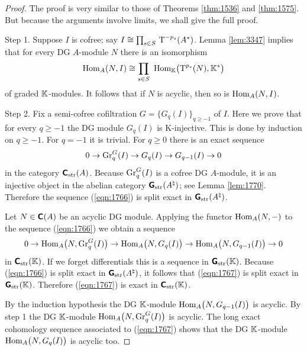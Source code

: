 \begin{proof}
The proof is very similar to those of Theorems \ref{thm:1536} and 
\ref{thm:1575}. But because the arguments involve limits, we shall give the 
full proof. 

\medskip \noindent
Step 1. Suppose $I$ is cofree; say 
$I \cong \prod_{s \in S} \, \operatorname{T}^{-p_s}(A^*)$. 
Lemma \ref{lem:3347} implies that for every DG $A$-module $N$ there is an 
isomorphism 
\[ \operatorname{Hom}_A(N, I) \cong 
\prod_{s \in S} \ \operatorname{Hom}_{\mathbb{K}} \bigl( \operatorname{T}^{p_s}(N), \mathbb{K}^* \bigr)  \]
of graded $\mathbb{K}$-modules.  It follows that if $N$ is acyclic, then so is 
$\operatorname{Hom}_A(N, I)$. 

\medskip \noindent
Step 2. Fix a semi-cofree cofiltration
$G = \{ G_q(I) \}_{q \geq -1}$ of $I$.
Here we prove that for every $q \geq -1$ the DG module  
$G_q(I)$ is K-injective. This is done by induction on $q \geq -1$. 
For $q= -1$ it is trivial. For $q \geq 0$ there is an exact sequence 
\begin{equation} \label{eqn:1766}
0 \to \operatorname{Gr}^G_q(I) \to G_q(I) \to G_{q - 1}(I) \to 0 
\end{equation}
in the category $\boldsymbol{\mathsf{C}}_{\mathrm{str}}(A)$. 
Because $\operatorname{Gr}^G_q(I)$ is a cofree DG $A$-module, it is an injective object 
in the abelian category $\operatorname{\boldsymbol{\mathsf{G}}}_{\mathrm{str}}(A^{\natural})$; see Lemma 
\ref{lem:1770}. Therefore the sequence (\ref{eqn:1766}) is split exact in 
$\operatorname{\boldsymbol{\mathsf{G}}}_{\mathrm{str}}(A^{\natural})$.

Let $N \in \boldsymbol{\mathsf{C}}(A)$ be an acyclic DG module. Applying the 
functor $\operatorname{Hom}_{A}(N, -)$ 
to the sequence (\ref{eqn:1766}) we obtain a sequence 
\begin{equation} \label{eqn:1767}
0 \to \operatorname{Hom}_{A} \bigl( N, \operatorname{Gr}^G_q(I) \bigr) \to 
\operatorname{Hom}_{A} \bigl( N, G_q(I) \bigr) \to
\operatorname{Hom}_{A} \bigl( N, G_{q - 1}(I) \bigr) \to  0 
\end{equation}
in $\boldsymbol{\mathsf{C}}_{\mathrm{str}}(\mathbb{K})$. If we forget differentials this is a sequence in 
$\operatorname{\boldsymbol{\mathsf{G}}}_{\mathrm{str}}(\mathbb{K})$. Because (\ref{eqn:1766}) is split exact in 
$\operatorname{\boldsymbol{\mathsf{G}}}_{\mathrm{str}}(A^{\natural})$, it follows that  (\ref{eqn:1767}) is 
split 
exact in $\operatorname{\boldsymbol{\mathsf{G}}}_{\mathrm{str}}(\mathbb{K})$. Therefore (\ref{eqn:1767}) is exact in 
$\boldsymbol{\mathsf{C}}_{\mathrm{str}}(\mathbb{K})$.

By the induction hypothesis the DG $\mathbb{K}$-module  
$\operatorname{Hom}_{A} \bigl( N, G_{q - 1}(I) \bigr)$
is \lb acyclic. By step 1 the DG $\mathbb{K}$-module
$\operatorname{Hom}_{A} \bigl( N, \operatorname{Gr}^G_{q}(I) \bigr)$
is acyclic. The long exact cohomology sequence associated to 
(\ref{eqn:1767}) shows that the DG $\mathbb{K}$-module 
$\operatorname{Hom}_{A} \bigl( N, G_q(I) \bigr)$
is acyclic too.


\end{proof}
